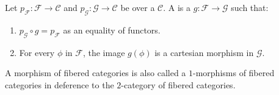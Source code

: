 \begin{definition} \label{definition:morphism_of_fibered_categories_over_a_category}
Let $p_{\mathcal{F}}: \mathcal{F} \to \mathcal{C}$ and $p_{\mathcal{G}}: \mathcal{G} \to \mathcal{C}$ be  over a  $\mathcal{C}$.
A  is a  $g: \mathcal{F} \to \mathcal{G}$ such that:
\begin{enumerate}
    \item $p_{\mathcal{G}} \circ g = p_{\mathcal{F}}$ as an equality of functors.
    \item For every  $\phi$ in $\mathcal{F}$, the image $g(\phi)$ is a cartesian morphism in $\mathcal{G}$.
\end{enumerate}

A morphism of fibered categories is also called a $1$-morphisms of fibered categories in deference to the $2$-category of fibered categories.

\end{definition}